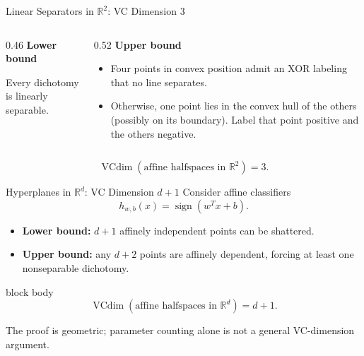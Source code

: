 \documentclass[aspectratio=169,10pt]{beamer}
\DeclareMathOperator{\sign}{sign}
\newcommand{\vcdim}{\operatorname{VCdim}}
\begin{document}
\begin{frame}[t]{Linear Separators in $\mathbb{R}^2$: VC Dimension $3$}
  \vspace{0.01cm}
  \begin{columns}[T,totalwidth=\textwidth]
    \begin{column}{0.46\textwidth}
      \textbf{Lower bound}
      \begin{center}
      \end{center}
      Every dichotomy is linearly separable.
    \end{column}
    \begin{column}{0.52\textwidth}
      \textbf{Upper bound}
      \begin{itemize}
        \setlength{\itemsep}{0.10cm}
        \item Four points in convex position admit an XOR labeling that no line separates.
        \item Otherwise, one point lies in the convex hull of the others (possibly on its boundary). Label that point positive and the others negative.
      \end{itemize}
    \end{column}
  \end{columns}
  \vspace{0.04cm}
  \[
    \boxed{\vcdim(\text{affine halfspaces in }\mathbb{R}^2)=3.}
  \]
\end{frame}

\begin{frame}[t]{Hyperplanes in $\mathbb{R}^d$: VC Dimension $d+1$}
  \vspace{0.01cm}
  Consider affine classifiers
  \[
    h_{w,b}(x)=\sign(w^Tx+b).
  \]
  \begin{itemize}
    \setlength{\itemsep}{0.12cm}
    \item \textbf{Lower bound:} $d+1$ affinely independent points can be shattered.
    \item \textbf{Upper bound:} any $d+2$ points are affinely dependent, forcing at least one nonseparable dichotomy.
  \end{itemize}
  \vspace{0.05cm}
  \begin{beamercolorbox}[rounded=true,sep=0.18cm,wd=\linewidth]{block body}
    \[
      \boxed{\vcdim(\text{affine halfspaces in }\mathbb{R}^d)=d+1.}
    \]
  \end{beamercolorbox}
  \vspace{0.08cm}
  \centering
  The proof is geometric; parameter counting alone is not a general VC-dimension argument.
\end{frame}
\end{document}
